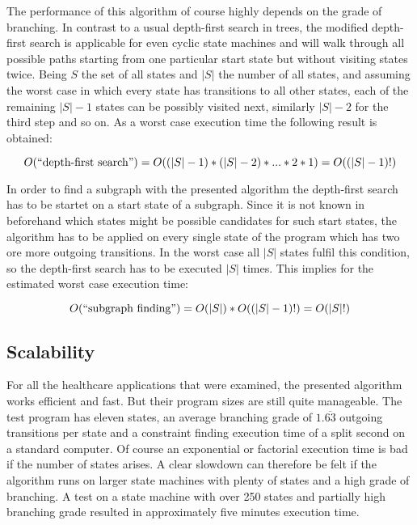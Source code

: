 The performance of this algorithm of course highly depends on the grade of branching. In contrast to a usual depth-first search in trees, the modified depth-first search is applicable for even cyclic state machines and will walk through all possible paths starting from one particular start state but without visiting states twice. Being $S$ the set of all states and $|S|$ the number of all states, and assuming the worst case in which every state has transitions to all other states, each of the remaining $|S|-1$ states can be possibly visited next, similarly $|S|-2$ for the third step and so on. As a worst case execution time the following result is obtained:


\begin{equation}
O(\textnormal{``depth-first search''})=O((|S|-1)*(|S|-2)*...*2*1)=O((|S|-1)!)
\end{equation}

In order to find a subgraph with the presented algorithm the depth-first search has to be startet on a start state of a subgraph. Since it is not known in beforehand which states might be possible candidates for such start states, the algorithm has to be applied on every single state of the program which has two ore more outgoing transitions. In the worst case all $|S|$ states fulfil this condition, so the depth-first search has to be executed $|S|$ times. This implies for the estimated worst case execution time:

\begin{equation}
O(\textnormal{``subgraph finding''})=O(|S|)*O((|S|-1)!)=O(|S|!)
\end{equation}



\subsection{Scalability}

For all the healthcare applications that were examined, the presented algorithm works efficient and fast. But their program sizes are still quite manageable. The test program has eleven states, an average branching grade of $1.\overline{63}$ outgoing transitions per state and a constraint finding execution time of a split second on a standard computer.
Of course an exponential or factorial execution time is bad if the number of states arises. A clear slowdown can therefore be felt if the algorithm runs on larger state machines with plenty of states and a high grade of branching. A test on a state machine with over 250 states and partially high branching grade resulted in approximately five minutes execution time.

